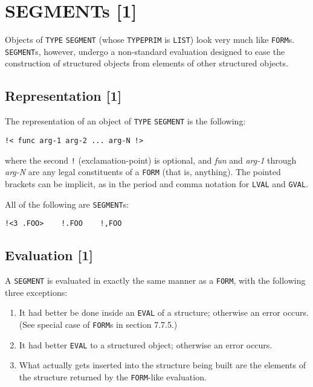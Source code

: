 \documentclass[a4paper]{scrbook}
\providecommand{\tightlist}{%
  \setlength{\itemsep}{0pt}\setlength{\parskip}{0pt}}
\begin{document}
\section{SEGMENTs {[}1{]}}\label{segments-1}

Objects of \texttt{TYPE} \texttt{SEGMENT} (whose \texttt{TYPEPRIM} is \texttt{LIST}) look
very much like \texttt{FORM}s. \texttt{SEGMENT}s, however, undergo a non-standard evaluation designed to ease the
construction of structured objects from elements of other structured objects.

\subsection{Representation {[}1{]}}\label{representation-1-2}

The representation of an object of \texttt{TYPE} \texttt{SEGMENT} is the following:

\begin{verbatim}
!< func arg-1 arg-2 ... arg-N !>
\end{verbatim}

 where the second \texttt{!} (exclamation-point) is optional, and
\emph{fun} and \emph{arg-1} through \emph{arg-N} are any legal constituents of a \texttt{FORM} (that is, anything). The
pointed brackets can be implicit, as in the period and comma notation for \texttt{LVAL} and \texttt{GVAL}.

All of the following are \texttt{SEGMENT}s:

\begin{verbatim}
!<3 .FOO>    !.FOO    !,FOO
\end{verbatim}


\subsection{Evaluation {[}1{]}}\label{evaluation-1-1}

A \texttt{SEGMENT} is evaluated in exactly the same manner as a \texttt{FORM}, with the following three exceptions:

\begin{enumerate}
\def\labelenumi{\arabic{enumi}.}
\tightlist
\item
  It had better be done inside an \texttt{EVAL} of a structure; otherwise an error occurs. (See special case of
  \texttt{FORM}s in section 7.7.5.)
\item
  It had better \texttt{EVAL} to a structured object; otherwise an error occurs.
\item
  What actually gets inserted into the structure being built are the elements of the structure returned by the
  \texttt{FORM}-like evaluation.
\end{enumerate}
\end{document}
